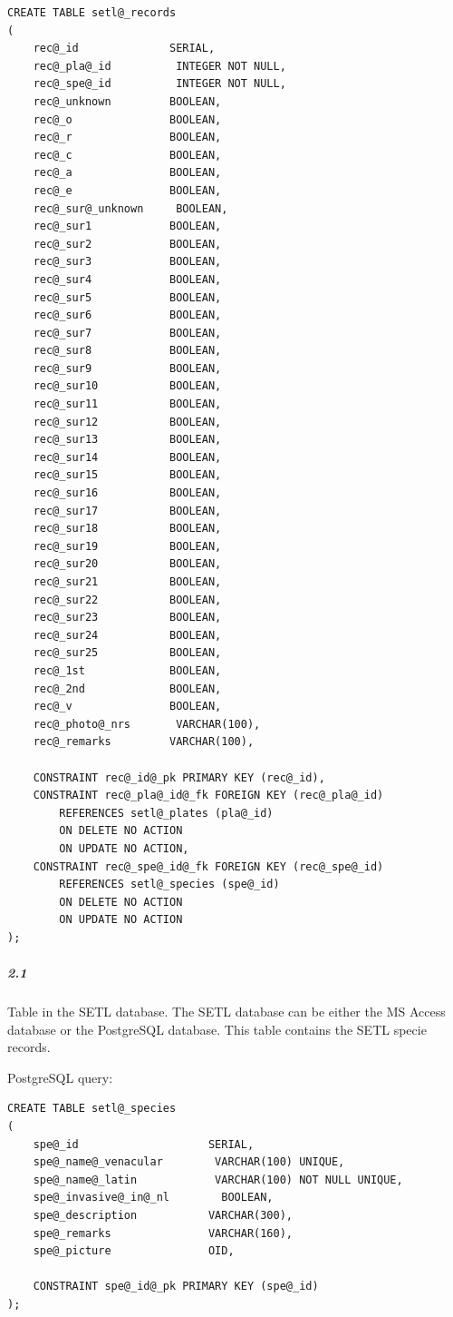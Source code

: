 \documentclass[letterpaper,10pt,english]{sphinxmanual}
\begin{document}
\begin{Verbatim}[commandchars=@\[\]]
CREATE TABLE setl@_records
(
    rec@_id              SERIAL,
    rec@_pla@_id          INTEGER NOT NULL,
    rec@_spe@_id          INTEGER NOT NULL,
    rec@_unknown         BOOLEAN,
    rec@_o               BOOLEAN,
    rec@_r               BOOLEAN,
    rec@_c               BOOLEAN,
    rec@_a               BOOLEAN,
    rec@_e               BOOLEAN,
    rec@_sur@_unknown     BOOLEAN,
    rec@_sur1            BOOLEAN,
    rec@_sur2            BOOLEAN,
    rec@_sur3            BOOLEAN,
    rec@_sur4            BOOLEAN,
    rec@_sur5            BOOLEAN,
    rec@_sur6            BOOLEAN,
    rec@_sur7            BOOLEAN,
    rec@_sur8            BOOLEAN,
    rec@_sur9            BOOLEAN,
    rec@_sur10           BOOLEAN,
    rec@_sur11           BOOLEAN,
    rec@_sur12           BOOLEAN,
    rec@_sur13           BOOLEAN,
    rec@_sur14           BOOLEAN,
    rec@_sur15           BOOLEAN,
    rec@_sur16           BOOLEAN,
    rec@_sur17           BOOLEAN,
    rec@_sur18           BOOLEAN,
    rec@_sur19           BOOLEAN,
    rec@_sur20           BOOLEAN,
    rec@_sur21           BOOLEAN,
    rec@_sur22           BOOLEAN,
    rec@_sur23           BOOLEAN,
    rec@_sur24           BOOLEAN,
    rec@_sur25           BOOLEAN,
    rec@_1st             BOOLEAN,
    rec@_2nd             BOOLEAN,
    rec@_v               BOOLEAN,
    rec@_photo@_nrs       VARCHAR(100),
    rec@_remarks         VARCHAR(100),

    CONSTRAINT rec@_id@_pk PRIMARY KEY (rec@_id),
    CONSTRAINT rec@_pla@_id@_fk FOREIGN KEY (rec@_pla@_id)
        REFERENCES setl@_plates (pla@_id)
        ON DELETE NO ACTION
        ON UPDATE NO ACTION,
    CONSTRAINT rec@_spe@_id@_fk FOREIGN KEY (rec@_spe@_id)
        REFERENCES setl@_species (spe@_id)
        ON DELETE NO ACTION
        ON UPDATE NO ACTION
);
\end{Verbatim}


\subparagraph{2.1}
\label{design_parts_data:id2}\label{design_parts_data:design-part-data-2-1}
Table  in the SETL database. The SETL database can be
either the MS Access database or the PostgreSQL database. This table
contains the SETL specie records.

PostgreSQL query:

\begin{Verbatim}[commandchars=@\[\]]
CREATE TABLE setl@_species
(
    spe@_id                    SERIAL,
    spe@_name@_venacular        VARCHAR(100) UNIQUE,
    spe@_name@_latin            VARCHAR(100) NOT NULL UNIQUE,
    spe@_invasive@_in@_nl        BOOLEAN,
    spe@_description           VARCHAR(300),
    spe@_remarks               VARCHAR(160),
    spe@_picture               OID,

    CONSTRAINT spe@_id@_pk PRIMARY KEY (spe@_id)
);
\end{Verbatim}
\end{document}
